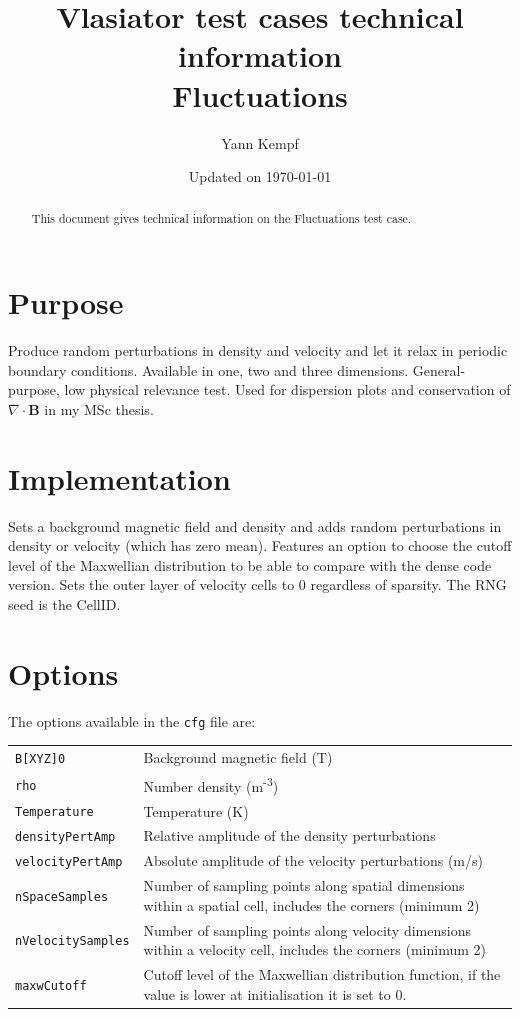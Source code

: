 \documentclass[a4paper,10pt]{scrartcl}
\title{
\Huge{Vlasiator test cases technical information} \\
\LARGE{Fluctuations}
}
\author{Yann Kempf}
\date{Updated on \today}
\begin{document}
\maketitle

\begin{abstract}
   This document gives technical information on the Fluctuations test case.
\end{abstract}

\section{Purpose}
Produce random perturbations in density and velocity and let it relax in periodic boundary conditions. Available in one, two and three dimensions. General-purpose, low physical relevance test. Used for dispersion plots and conservation of $\nabla\cdot\mathbf{B}$ in my MSc thesis.


\section{Implementation}
Sets a background magnetic field and density and adds random perturbations in density or velocity (which has zero mean). Features an option to choose the cutoff level of the Maxwellian distribution to be able to compare with the dense code version. Sets the outer layer of velocity cells to 0 regardless of sparsity. The RNG seed is the CellID.

\section{Options}
The options available in the \verb=cfg= file are:

\begin{tabularx}{\textwidth}{lX}
   \verb=B[XYZ]0= & Background magnetic field (T) \\
   \verb=rho= & Number density (m\textsuperscript{-3}) \\
   \verb=Temperature= & Temperature (K) \\
   \verb=densityPertAmp= & Relative amplitude of the density perturbations \\
   \verb=velocityPertAmp= & Absolute amplitude of the velocity perturbations (m/s) \\
   \verb=nSpaceSamples= & Number of sampling points along spatial dimensions within a spatial cell, includes the corners (minimum 2) \\
   \verb=nVelocitySamples= & Number of sampling points along velocity dimensions within a velocity cell, includes the corners (minimum 2) \\
   \verb=maxwCutoff= & Cutoff level of the Maxwellian distribution function, if the value is lower at initialisation it is set to 0.
\end{tabularx}
\end{document}
